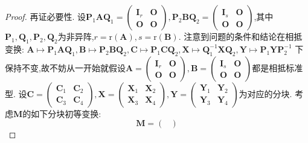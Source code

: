 \documentclass[lang=cn,newtx,10pt,scheme=chinese]{elegantbook}
\begin{document}
\begin{proof}
        再证必要性. 设\(\boldsymbol{P}_1\boldsymbol{A}\boldsymbol{Q}_1=\begin{pmatrix}
        \boldsymbol{I}_r&\boldsymbol{O}\\
        \boldsymbol{O}&\boldsymbol{O}
        \end{pmatrix},\boldsymbol{P}_2\boldsymbol{B}\boldsymbol{Q}_2=\begin{pmatrix}
        \boldsymbol{I}_s&\boldsymbol{O}\\
        \boldsymbol{O}&\boldsymbol{O}
        \end{pmatrix}\),其中\(\boldsymbol{P}_1,\boldsymbol{Q}_1,\boldsymbol{P}_2,\boldsymbol{Q}_2\)为非异阵,\(r = \mathrm{r}(\boldsymbol{A}),s=\mathrm{r}(\boldsymbol{B})\). 注意到问题的条件和结论在相抵变换:
        \(\boldsymbol{A}\mapsto\boldsymbol{P}_1\boldsymbol{A}\boldsymbol{Q}_1,\boldsymbol{B}\mapsto\boldsymbol{P}_2\boldsymbol{B}\boldsymbol{Q}_2,\boldsymbol{C}\mapsto\boldsymbol{P}_1\boldsymbol{C}\boldsymbol{Q}_2,\boldsymbol{X}\mapsto\boldsymbol{Q}_1^{-1}\boldsymbol{X}\boldsymbol{Q}_2,\boldsymbol{Y}\mapsto\boldsymbol{P}_1\boldsymbol{Y}\boldsymbol{P}_2^{-1}\)
        下保持不变,故不妨从一开始就假设\(\boldsymbol{A}=\begin{pmatrix}
        \boldsymbol{I}_r&\boldsymbol{O}\\
        \boldsymbol{O}&\boldsymbol{O}
        \end{pmatrix},\boldsymbol{B}=\begin{pmatrix}
        \boldsymbol{I}_s&\boldsymbol{O}\\
        \boldsymbol{O}&\boldsymbol{O}
        \end{pmatrix}\)都是相抵标准型. 设\(\boldsymbol{C}=\begin{pmatrix}
        \boldsymbol{C}_1&\boldsymbol{C}_2\\
        \boldsymbol{C}_3&\boldsymbol{C}_4
        \end{pmatrix},\boldsymbol{X}=\begin{pmatrix}
        \boldsymbol{X}_1&\boldsymbol{X}_2\\
        \boldsymbol{X}_3&\boldsymbol{X}_4
        \end{pmatrix},\boldsymbol{Y}=\begin{pmatrix}
        \boldsymbol{Y}_1&\boldsymbol{Y}_2\\
        \boldsymbol{Y}_3&\boldsymbol{Y}_4
        \end{pmatrix}\)为对应的分块. 考虑\(\boldsymbol{M}\)的如下分块初等变换:
        \[
        \boldsymbol{M}=\begin{pmatrix}

\end{pmatrix}\]
\end{proof}
\end{document}
